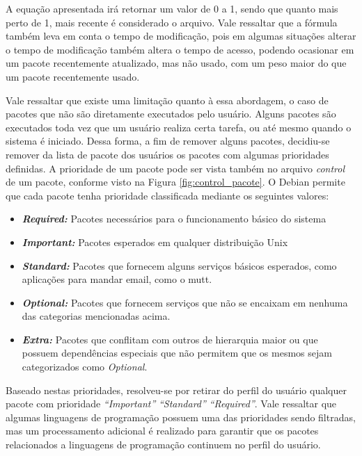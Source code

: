 A equação apresentada irá retornar um valor de 0 a 1, sendo que quanto mais
perto de 1, mais recente é considerado o arquivo. Vale ressaltar que a fórmula
também leva em conta o tempo de modificação, pois em algumas situações alterar o
tempo de modificação também altera o tempo de acesso, podendo ocasionar em um
pacote recentemente atualizado, mas não usado, com um peso maior do que um
pacote recentemente usado.

Vale ressaltar que existe uma limitação quanto à essa abordagem, o caso de
pacotes que não são diretamente executados pelo usuário. Alguns pacotes são
executados toda vez que um usuário realiza certa tarefa, ou até mesmo quando o
sistema é iniciado. Dessa forma, a fim de remover alguns pacotes, decidiu-se
remover da lista de pacote dos usuários os pacotes com algumas prioridades definidas.
A prioridade de um pacote pode ser vista também no arquivo \textit{control} de um pacote, conforme visto
na Figura \ref{fig:control_pacote}. O Debian permite que cada pacote tenha
prioridade classificada mediante os seguintes valores:

\begin{itemize}
    \item \textit{\textbf{Required:}} Pacotes necessários para o funcionamento básico do
        sistema
    \item \textit{\textbf{Important:}} Pacotes esperados em qualquer distribuição Unix
    \item \textit{\textbf{Standard:}} Pacotes que fornecem alguns serviços básicos
        esperados, como aplicações para mandar email, como o mutt.
    \item \textit{\textbf{Optional:}} Pacotes que fornecem serviços que não se encaixam
        em nenhuma das categorias mencionadas acima.
    \item \textit{\textbf{Extra:}} Pacotes que conflitam com outros de hierarquia maior
        ou que possuem dependências especiais que não permitem que os mesmos
        sejam categorizados como \textit{Optional}.
\end{itemize}

Baseado nestas prioridades, resolveu-se por retirar do perfil do usuário
qualquer pacote com prioridade \textit{``Important''} \textit{``Standard''}
\textit{``Required''}. Vale ressaltar que algumas linguagens de programação
possuem uma das prioridades sendo filtradas, mas um processamento adicional é
realizado para garantir que os pacotes relacionados a linguagens de programação
continuem no perfil do usuário.

